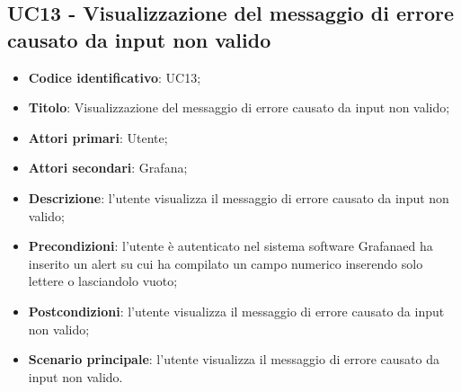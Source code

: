 \subsection{UC13 - Visualizzazione del messaggio di errore causato da input non valido}
\begin{itemize}
	\item \textbf{Codice identificativo}: UC13;
	\item \textbf{Titolo}: Visualizzazione del messaggio di errore causato da input non valido;
	\item \textbf{Attori primari}: Utente;
	\item \textbf{Attori secondari}: Grafana\glo;
	\item \textbf{Descrizione}: l'utente visualizza il messaggio di errore causato da input non valido;
	\item \textbf{Precondizioni}: l'utente è autenticato nel sistema software Grafana\glosp ed ha inserito un alert su cui ha compilato un campo numerico inserendo solo lettere o lasciandolo vuoto;
	\item \textbf{Postcondizioni}: l'utente visualizza il messaggio di errore causato da input non valido;
	\item \textbf{Scenario principale}: l'utente visualizza il messaggio di errore causato da input non valido.
\end{itemize}